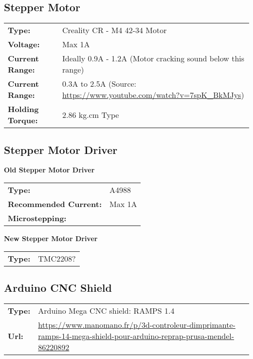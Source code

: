\subsection{Stepper Motor}


\begin{tabular}{@{}ll}
    \textbf{Type:} & Creality CR - M4 42-34 Motor \\
    \textbf{Voltage:} & Max 1A \\
    \textbf{Current Range:} & Ideally 0.9A - 1.2A (Motor cracking sound below this range) \\
    \textbf{Current Range:} & 0.3A to 2.5A (Source: \url{https://www.youtube.com/watch?v=7spK_BkMJys}) \\
    \textbf{Holding Torque:} & 2.86 kg.cm Type \\
\end{tabular}


\subsection{Stepper Motor Driver}

\textbf{Old Stepper Motor Driver}

\begin{tabular}{@{}ll}
    \textbf{Type:} & A4988 \\
    \textbf{Recommended Current:} & Max 1A \\
    \textbf{Microstepping:} & \\
\end{tabular}

\noindent
\textbf{New Stepper Motor Driver}

\begin{tabular}{@{}ll}
    \textbf{Type:} & TMC2208? \\
\end{tabular}


\subsection{Arduino CNC Shield}

\begin{tabular}{@{}ll}
    \textbf{Type:} & Arduino Mega CNC shield: RAMPS 1.4  \\
    \textbf{Url:} & \url{https://www.manomano.fr/p/3d-controleur-dimprimante-ramps-14-mega-shield-pour-arduino-reprap-prusa-mendel-86220892} \\
\end{tabular}

